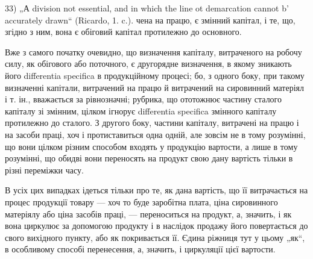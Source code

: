 33) „А division not essential, and in which the line ot demarcation cannot b'
accurately drawn“ (Ricardo, 1. c.).
чена на працю, є змінний капітал, і те, що, згідно з ним, вона є обіговий
капітал протилежно до основного.

Вже з самого початку очевидно, що визначення капіталу, витраченого
на робочу силу, як обігового або поточного, є другорядне визначення,
в якому зникають його differentia specifica в продукційному процесі;
бо, з одного боку, при такому визначенні капітали, витрачений на працю
й витрачений на сировинний матеріял і т. ін., вважається за рівнозначні;
рубрика, що ототожнює частину сталого капіталу зі змінним, цілком ігнорує
differentia specifica змінного капіталу протилежно до сталого. З другого
боку, частини капіталу, витрачені на працю і на засоби праці, хоч
і протиставиться одна одній, але зовсім не в тому розумінні, що вони
цілком різним способом входять у продукцію вартости, а лише в тому
розумінні, що обидві вони переносять на продукт свою дану вартість
тільки в різні переміжки часу.

В усіх цих випадках ідеться тільки про те, як дана вартість, що її
витрачається на процес продукції товару — хоч то буде заробітна плата,
ціна сировинного матеріялу або ціна засобів праці, — переноситься на
продукт, а, значить, і як вона циркулює за допомогою продукту і в наслідок
продажу його повертається до свого вихідного пункту, або як
покривається її. Єдина ріжниця тут у цьому „як“, в особливому способі
перенесення, а, значить, і циркуляції цієї вартости.


